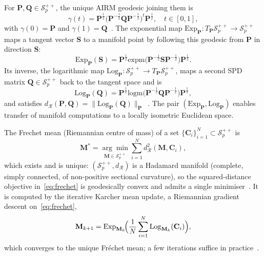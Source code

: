 For $\mathbf{P},\mathbf{Q}\in\mathcal{S}^{++}_p$, the unique AIRM geodesic
joining them is
\begin{equation}
  \gamma(t) = \mathbf{P}^{\frac{1}{2}}
    \bigl(\mathbf{P}^{-\frac{1}{2}}\mathbf{Q}\mathbf{P}^{-\frac{1}{2}}\bigr)^{t}
    \mathbf{P}^{\frac{1}{2}},
  \quad t\in[0,1],
  \label{eq:geodesic}
\end{equation}
with $\gamma(0)=\mathbf{P}$ and $\gamma(1)=\mathbf{Q}$~\cite{bhatia2009positive}.
The exponential map $\mathrm{Exp}_\mathbf{P}:T_\mathbf{P}\mathcal{S}^{++}_p
\to\mathcal{S}^{++}_p$ maps a tangent vector $\mathbf{S}$ to a manifold point
by following this geodesic from $\mathbf{P}$ in direction $\mathbf{S}$:
\begin{equation}
  \mathrm{Exp}_\mathbf{P}(\mathbf{S})
    = \mathbf{P}^{\frac{1}{2}}
        \mathrm{expm}\!\bigl(\mathbf{P}^{-\frac{1}{2}}\mathbf{S}\mathbf{P}^{-\frac{1}{2}}\bigr)
      \mathbf{P}^{\frac{1}{2}}.
  \label{eq:exp_map}
\end{equation}
Its inverse, the logarithmic map
$\mathrm{Log}_\mathbf{P}:\mathcal{S}^{++}_p\to T_\mathbf{P}\mathcal{S}^{++}_p$,
maps a second SPD matrix $\mathbf{Q}\in\mathcal{S}^{++}_p$ back to the tangent
space and is
\begin{equation}
  \mathrm{Log}_\mathbf{P}(\mathbf{Q})
    = \mathbf{P}^{\frac{1}{2}}
        \mathrm{logm}\!\bigl(\mathbf{P}^{-\frac{1}{2}}\mathbf{Q}\mathbf{P}^{-\frac{1}{2}}\bigr)
      \mathbf{P}^{\frac{1}{2}},
  \label{eq:log_map}
\end{equation}
and satisfies $d_\mathcal{R}(\mathbf{P},\mathbf{Q})=\|\mathrm{Log}_\mathbf{P}(\mathbf{Q})\|_\mathbf{P}$~\cite{absil2008optimization}.
The pair $(\mathrm{Exp}_\mathbf{P},\mathrm{Log}_\mathbf{P})$ enables transfer of
manifold computations to a locally isometric Euclidean space.

The Frechet mean (Riemannian centre of mass) of a set
$\{\mathbf{C}_i\}_{i=1}^N\subset\mathcal{S}^{++}_p$ is
\begin{equation}
  \mathbf{M}^* = \underset{\mathbf{M}\in\mathcal{S}^{++}_p}{\arg\min}
    \sum_{i=1}^N d_\mathcal{R}^2(\mathbf{M},\mathbf{C}_i),
  \label{eq:frechet}
\end{equation}
which exists and is unique: $(\mathcal{S}^{++}_p, d_\mathcal{R})$ is a Hadamard
manifold (complete, simply connected, of non-positive sectional curvature), so
the squared-distance objective in~\eqref{eq:frechet} is geodesically convex and
admits a single
minimiser~\cite{karcher1977riemannian,bhatia2009positive}.
It is computed by the iterative Karcher mean update, a Riemannian gradient
descent on~\eqref{eq:frechet},
\begin{equation}
  \mathbf{M}_{k+1} = \mathrm{Exp}_{\mathbf{M}_k}\!
    \Bigl(\frac{1}{N}\sum_{i=1}^N \mathrm{Log}_{\mathbf{M}_k}(\mathbf{C}_i)\Bigr),
  \label{eq:karcher}
\end{equation}
which converges to the unique Fréchet mean; a few iterations suffice in
practice~\cite{boumal2023introduction}.


